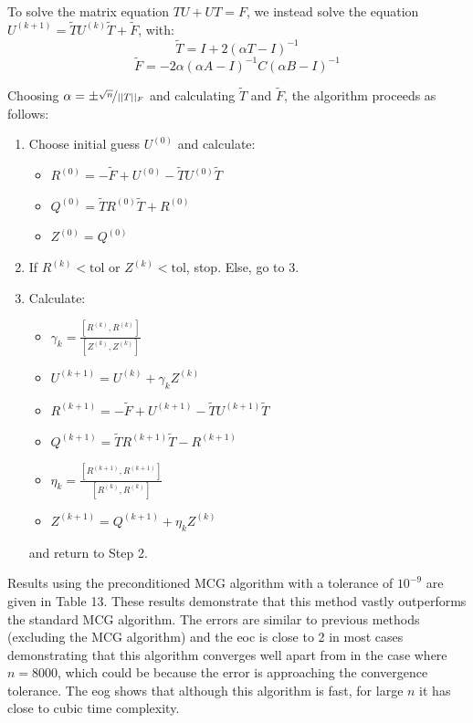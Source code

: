 \documentclass{article}
\numberwithin{equation}{section}
\begin{document}
To solve the matrix equation $TU + UT = F$, we instead solve the equation $U^{(k+1)} = \widetilde{T}U^{(k)} \widetilde{T} + \widetilde{F}$, with:
\[ \widetilde{T} = I + 2(\alpha T - I)^{-1} \]
\[ \widetilde{F} = -2\alpha(\alpha A - I)^{-1} C (\alpha B - I)^{-1} \]

Choosing $\alpha = \pm \nicefrac{\sqrt{n}}{||T||_F}$ and calculating $\widetilde{T}$ and $\widetilde{F}$, the algorithm proceeds as follows:
\begin{enumerate}
\item Choose initial guess $U^{(0)}$ and calculate:
	\begin{itemize}
	\item $R^{(0)} = -\widetilde{F} + U^{(0)} - \widetilde{T}U^{(0)} \widetilde{T}$
	\item $Q^{(0)} = \widetilde{T} R^{(0)}\widetilde{T} + R^{(0)}$
	\item $Z^{(0)} = Q^{(0)}$
	\end{itemize}
\item If $R^{(k)} < \text{tol}$ or $Z^{(k)} < \text{tol}$, stop. Else, go to 3.
\item Calculate:
	\begin{itemize}
	\item $ \gamma_k = \frac{[R^{(k)}, R^{(k)}]}{[Z^{(k)}, Z^{(k)}]}$
	\item $U^{(k+1)} = U^{(k)} + \gamma_k Z^{(k)} $
	\item $R^{(k+1)} = -\widetilde{F} + U^{(k+1)} - \widetilde{T}U^{(k+1)} \widetilde{T}$
	\item $Q^{(k+1)} = \widetilde{T} R^{(k+1)}\widetilde{T} - R^{(k+1)}$
	\item $\eta_k = \frac{[R^{(k+1)}, R^{(k+1)}]}{[R^{(k)}, R^{(k)}]}$ 
	\item $Z^{(k+1)} = Q^{(k+1)} + \eta_k Z^{(k)}$
	\end{itemize}
	and return to Step 2.
\end{enumerate}

Results using the preconditioned MCG algorithm with a tolerance of $10^{-9}$ are given in Table 13. These results demonstrate that this method vastly outperforms the standard MCG algorithm. The errors are similar to previous methods (excluding the MCG algorithm) and the eoc is close to 2 in most cases demonstrating that this algorithm converges well apart from in the case where $n=8000$, which could be because the error is approaching the convergence tolerance. The eog shows that although this algorithm is fast, for large $n$ it has close to cubic time complexity. 
\end{document}
